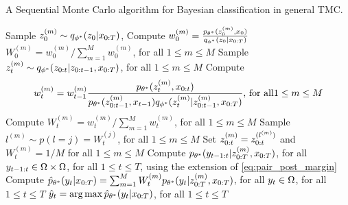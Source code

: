 

\begin{algorithm}[htbp!]
  \caption{A Sequential Monte Carlo algorithm for Bayesian classification in general TMC.}
  \label{algo:tmc_inf}
\begin{algorithmic}[1]
  \State  Sample $z_0^{(m)}\sim q_{\phi^*}(z_0|x_{0:T})$, 
  \State Compute $w_0^{(m)} = \frac{p_{\theta^*}(z_0^{(m)}, x_0)}{q_{\phi^*}(z_0|x_{0:T})}$ 
  $W_0^{(m)} = w_0^{(m)} / \sum_{m=1}^M w_0^{(m)} $, for all $1 \leq m \leq M$
  \State Sample $z_t^{(m)}\sim q_{\phi^*}(z_{0:t}|z_{0:t-1},x_{0:T})$, for all  $1 \leq m \leq M$ 
  \State Compute
  \begin{equation*}
    w_t^{(m)}=w_{t-1}^{(m)} \frac{p_{\theta^*}(z_{t}^{(m)},x_{0:t})}
    {p_{\theta^*}(z_{0:t-1}^{(m)},x_{t-1})q_{\phi^*}(z_t^{(m)}|z_{0:t-1}^{(m)},x_{0:T})}\text{, for all}  1 \leq m \leq M  
  \end{equation*}
  \State Compute $W_t^{(m)}=w_{t}^{(m)}/ \sum_{m=1}^M w_{t}^{(m)}$, for all  $1 \leq m \leq M$ 
      \State Sample $l^{(m)} \sim p(l=j)=W_t^{(j)}$, for all  $1 \leq m \leq M$ 
      \State Set $z_{0:t}^{(m)}=z_{0:t}^{(l^{(m)})}$ and $W_t^{(m)}=1/M$  for all  $1 \leq m \leq M$
    \EndIf
    \EndFor
  \State Compute $p_{\theta^*}(y_{t-1:t}|z_{0:T}^{(m)},x_{0:T})$, for all $y_{t-1:t} \in \Omega \times \Omega$, for all $1\leq t \leq T$, using the extension of  \eqref{eq:pair_post_margin}
  \State Compute $\hat{p}_{\theta^*}(y_t|x_{0:T}) =\sum_{m=1}^M W_t^{(m)} p_{\theta^*}(y_t|z_{0:T}^{(m)},x_{0:T})$, for all $y_t \in \Omega$, for all $1\leq t \leq T$
  \State $\hat{y}_t= \operatorname*{arg\,max} \hat{p}_{\theta^*}(y_t|x_{0:T})$,  for all $1\leq t \leq T$
\end{algorithmic}
\end{algorithm}


